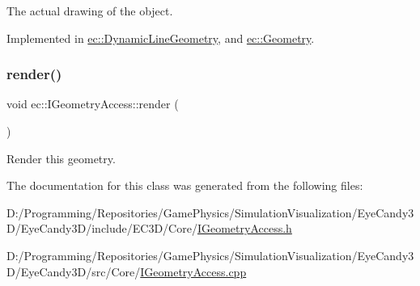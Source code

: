 The actual drawing of the object. 



Implemented in \mbox{\hyperlink{classec_1_1_dynamic_line_geometry_ab56984cee973ef2a73ff67339014f0cf}{ec\+::\+Dynamic\+Line\+Geometry}}, and \mbox{\hyperlink{classec_1_1_geometry_a1f166e70fc880e88092f29ef46afb836}{ec\+::\+Geometry}}.

\mbox{\label{classec_1_1_i_geometry_access_a9b6eaf56646bc2b5aa29385aaba02c7d}} 
\subsubsection{\texorpdfstring{render()}{render()}}
{\footnotesize\ttfamily void ec\+::\+I\+Geometry\+Access\+::render (\begin{DoxyParamCaption}{ }\end{DoxyParamCaption})\hspace{0.3cm}{\ttfamily [virtual]}}



Render this geometry. 



The documentation for this class was generated from the following files\+:\begin{DoxyCompactItemize}
\item 
D\+:/\+Programming/\+Repositories/\+Game\+Physics/\+Simulation\+Visualization/\+Eye\+Candy3\+D/\+Eye\+Candy3\+D/include/\+E\+C3\+D/\+Core/\mbox{\hyperlink{_i_geometry_access_8h}{I\+Geometry\+Access.\+h}}\item 
D\+:/\+Programming/\+Repositories/\+Game\+Physics/\+Simulation\+Visualization/\+Eye\+Candy3\+D/\+Eye\+Candy3\+D/src/\+Core/\mbox{\hyperlink{_i_geometry_access_8cpp}{I\+Geometry\+Access.\+cpp}}\end{DoxyCompactItemize}
